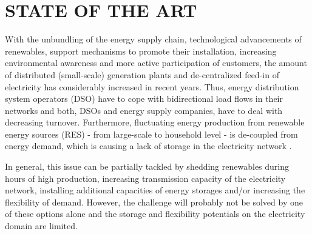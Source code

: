 \documentclass[a4paper,twoside]{article}
\begin{document}
\section{\uppercase{State of the art}}
\label{sec:soa}
\noindent
With the unbundling of the energy supply chain, technological
advancements of renewables, support mechanisms to promote their
installation, increasing environmental awareness and more active
participation of customers, the amount of distributed (small-scale)
generation plants and de-centralized feed-in of electricity has
considerably increased in recent years. Thus, energy distribution
system operators (DSO) have to cope with bidirectional load flows in
their networks and both, DSOs and energy supply companies, have to
deal with decreasing turnover. Furthermore, fluctuating energy
production from renewable energy sources (RES) - from large-scale to
household level - is de-coupled from  energy demand, which is 
causing a lack of storage in the electricity network
\cite{trebolle_2010}. 

In general, this issue can be partially tackled by shedding
renewables during hours of high production, increasing
transmission capacity of the electricity network, installing
additional capacities of energy storages and/or increasing the
flexibility of demand.
However, the challenge will probably not be solved by one of these
options alone and the storage and flexibility potentials on the
electricity domain are limited. 
\end{document}
